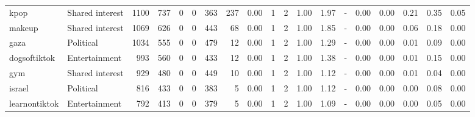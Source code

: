 \begin{tabular}{llrrrrrrrrrrrrrrrrr}
            kpop & Shared interest &   1100 &    737 &                           0 &                            0 &           363 &                        237 &     0.00 &    1 &      2 & 1.00 &   1.97 &                                - &   0.00 &         0.00 &                                0.21 &                                   0.35 &                                     0.05 \\
          makeup & Shared interest &   1069 &    626 &                           0 &                            0 &           443 &                         68 &     0.00 &    1 &      2 & 1.00 &   1.85 &                                - &   0.00 &         0.00 &                                0.06 &                                   0.18 &                                     0.00 \\
            gaza &       Political &   1034 &    555 &                           0 &                            0 &           479 &                         12 &     0.00 &    1 &      2 & 1.00 &   1.29 &                                - &   0.00 &         0.00 &                                0.01 &                                   0.09 &                                     0.00 \\
    dogsoftiktok &   Entertainment &    993 &    560 &                           0 &                            0 &           433 &                         12 &     0.00 &    1 &      2 & 1.00 &   1.38 &                                - &   0.00 &         0.00 &                                0.01 &                                   0.15 &                                     0.00 \\
             gym & Shared interest &    929 &    480 &                           0 &                            0 &           449 &                         10 &     0.00 &    1 &      2 & 1.00 &   1.12 &                                - &   0.00 &         0.00 &                                0.01 &                                   0.04 &                                     0.00 \\
          israel &       Political &    816 &    433 &                           0 &                            0 &           383 &                          5 &     0.00 &    1 &      2 & 1.00 &   1.12 &                                - &   0.00 &         0.00 &                                0.00 &                                   0.08 &                                     0.00 \\
   learnontiktok &   Entertainment &    792 &    413 &                           0 &                            0 &           379 &                          5 &     0.00 &    1 &      2 & 1.00 &   1.09 &                                - &   0.00 &         0.00 &                                0.00 &                                   0.05 &                                     0.00 \\

\end{tabular}

